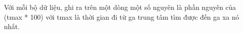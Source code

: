 Với mỗi bộ dữ liệu, ghi ra trên một dòng một số nguyên là phần nguyên của (tmax * 100) với tmax là thời gian đi từ ga trung tâm tìm được đến ga xa nó nhất.  

\